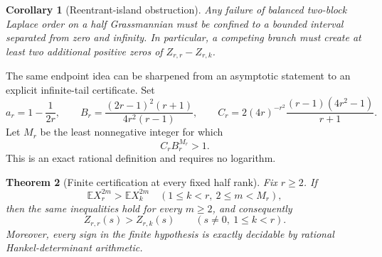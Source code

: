 \documentclass[11pt]{article}
\newtheorem{theorem}{Theorem}[section]
\newtheorem{corollary}[theorem]{Corollary}
\newcommand{\E}{\mathbb E}
\begin{document}
\begin{corollary}[Reentrant-island obstruction]
Any failure of balanced two-block Laplace order on a half Grassmannian must
be confined to a bounded interval separated from zero and infinity.  In
particular, a competing branch must create at least two additional positive
zeros of $Z_{r,r}-Z_{r,k}$.
\end{corollary}

The same endpoint idea can be sharpened from an asymptotic statement to an
explicit infinite-tail certificate.  Set
\begin{equation}
 a_r=1-\frac1{2r},\qquad
 B_r=\frac{(2r-1)^2(r+1)}{4r^2(r-1)},\qquad
 C_r=2(4r)^{-r^2}\frac{(r-1)(4r^2-1)}{r+1}.                \tag{4.3}
\end{equation}
Let $M_r$ be the least nonnegative integer for which
\begin{equation}
 C_rB_r^{M_r}>1.                                           \tag{4.4}
\end{equation}
This is an exact rational definition and requires no logarithm.

\begin{theorem}[Finite certification at every fixed half rank]
\label{thm:finite-cert}
Fix $r\ge2$.  If
\begin{equation}
 \E X_r^{2m}>\E X_k^{2m}
 \quad(1\le k<r,\ 2\le m<M_r),                            \tag{4.5}
\end{equation}
then the same inequalities hold for every $m\ge2$, and consequently
\begin{equation}
 Z_{r,r}(s)>Z_{r,k}(s)\qquad(s\ne0,\ 1\le k<r).            \tag{4.6}
\end{equation}
Moreover, every sign in the finite hypothesis is exactly decidable by
rational Hankel-determinant arithmetic.
\end{theorem}
\end{document}
